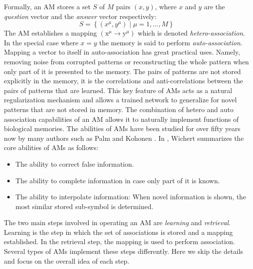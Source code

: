 \documentclass[runningheads]{llncs}
\begin{document}
Formally, an AM stores a set $S$ of $M$ pairs $(x,y)$, where $x$ and $y$ are the \textit{question} vector and the \textit{answer} vector respectively:
\begin{equation}
\label{eqn:S}
S=\left\{\left(x^{\mu}, y^{\mu}\right) \mid \mu=1, \ldots, M\right\}
\end{equation}
The AM establishes a mapping $\left(\mathrm{x}^{\mu} \rightarrow \mathrm{y}^{\mu}\right)$ which is denoted\textit{ hetero-association}.
In the special case where $x=y$ the memory is said to perform \textit{auto-association}. Mapping a vector to itself in auto-association has great practical uses. Namely, removing noise from corrupted patterns or reconstructing the whole pattern when only part of it is presented to the memory. The pairs of patterns are not stored explicitly in the memory, it is the correlations and anti-correlations between the pairs of patterns that are learned. This key feature of AMs acts as a natural regularization mechanism and allows a trained network to generalize for novel patterns that are not stored in memory.
The combination of hetero and auto association capabilities of an AM allows it to naturally implement functions of biological memories. The abilities of AMs have been studied for over fifty years now by many authors such as Palm \cite{palm1980associative} and Kohonen \cite{kohonen2012self}. In \cite{wichert2020principles}, Wichert summarizes the core abilities of AMs as follows:
\begin{itemize}
    \item The ability to correct false information.
    \item The ability to complete information in case only part of it is known.
    \item The ability to interpolate information: When novel information is shown, the most similar stored sub-symbol is determined.
\end{itemize}

The two main steps involved in operating an AM are \textit{learning} and \textit{retrieval}. Learning is the step in which the set of associations is stored and a mapping established. In the retrieval step, the mapping is used to perform association. Several types of AMs implement these steps differently. Here we skip the details and focus on the overall idea of each step.
\end{document}
